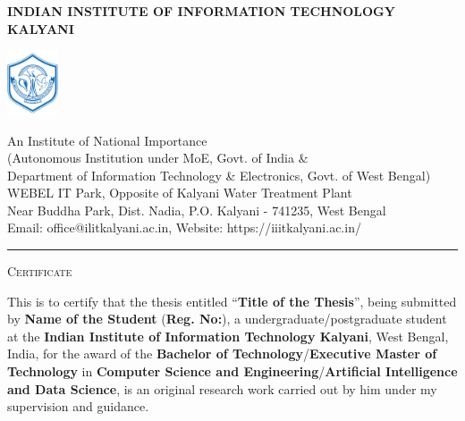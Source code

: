  \cleardoublepage
 \thispagestyle{empty}
 \begin{center}
 {\bf\uppercase{Indian Institute of Information Technology Kalyani}}\\
 \vspace{-0.3cm}
 \end{center}
\begin{multicols}{2}
 \flushleft
 \vspace{-2cm}
 \includegraphics[width=15mm]{Figure/header/IIITK.png}
 \columnbreak
 \par
 \begin{center}
 \hspace{-75mm} {\large An Institute of National Importance \vspace{0.15cm}}\\
 \hspace{-73mm} \textmd{(Autonomous Institution under MoE, Govt. of India \& \vspace{0.15cm}} \\
 \hspace{-66mm}\textmd{Department of Information Technology \& Electronics, Govt. of West Bengal)}\\
 \hspace{-73mm}\textmd{WEBEL IT Park, Opposite of Kalyani Water Treatment Plant \vspace{0.1cm}}\\
 \hspace{-71mm} \textmd{Near Buddha Park, Dist. Nadia, P.O. Kalyani - 741235, West Bengal \vspace{0.1cm}}\\
 \hspace{-73mm} \textmd{Email: office@ilitkalyani.ac.in, Website: https://iiitkalyani.ac.in/}
 \end{center}
\end{multicols}
 \vspace{-1cm}
 \begin{center}
\rule{\textwidth}{0.04cm}
\end{center}
 \vspace{0.5cm}
\begin{center}
{\LARGE \textsc{Certificate}}
\end{center}
\vspace{0.5cm} This is to certify that the thesis entitled
``\textbf{Title of the Thesis}'', being submitted by \textbf{Name of
the Student} (\textbf{Reg. No:}), a undergraduate/postgraduate
student at the \textbf{Indian Institute of Information Technology
Kalyani}, West Bengal, India, for the award of the \textbf{Bachelor
of Technology}/\textbf{Executive Master of Technology} in
\textbf{Computer Science and Engineering}/\textbf{Artificial
Intelligence and Data Science}, is an original research work carried
out by him under my supervision and guidance.

